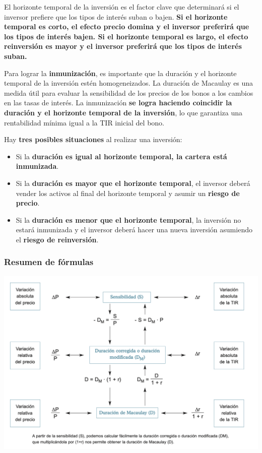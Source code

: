 \documentclass[
  letterpaper,
  DIV=11,
  numbers=noendperiod]{scrartcl}
\begin{document}
El horizonte temporal de la inversión es el factor clave que determinará
si el inversor prefiere que los tipos de interés suban o bajen.
\textbf{Si el horizonte temporal es corto, el efecto precio domina y el
inversor preferirá que los tipos de interés bajen. Si el horizonte
temporal es largo, el efecto reinversión es mayor y el inversor
preferirá que los tipos de interés suban.}

Para lograr la \textbf{inmunización}, es importante que la duración y el
horizonte temporal de la inversión estén homogeneizados. La duración de
Macaulay es una medida útil para evaluar la sensibilidad de los precios
de los bonos a los cambios en las tasas de interés. La inmunización
\textbf{se logra haciendo coincidir la duración y el horizonte temporal
de la inversión}, lo que garantiza una rentabilidad mínima igual a la
TIR inicial del bono.

Hay \textbf{tres posibles situaciones} al realizar una inversión:

\begin{itemize}
\item
  Si la \textbf{duración es igual al horizonte temporal, la cartera está
  inmunizada}.
\item
  Si la \textbf{duración es mayor que el horizonte temporal}, el
  inversor deberá vender los activos al final del horizonte temporal y
  asumir un \textbf{riesgo de precio}.
\item
  Si la \textbf{duración es menor que el horizonte temporal}, la
  inversión no estará inmunizada y el inversor deberá hacer una nueva
  inversión asumiendo el \textbf{riesgo de reinversión}.
\end{itemize}

\hypertarget{resumen-de-fuxf3rmulas}{%
\subsubsection{Resumen de fórmulas}\label{resumen-de-fuxf3rmulas}}

\includegraphics{images/Captura de pantalla 2023-07-12 a las 12.54.38.png}
\end{document}
